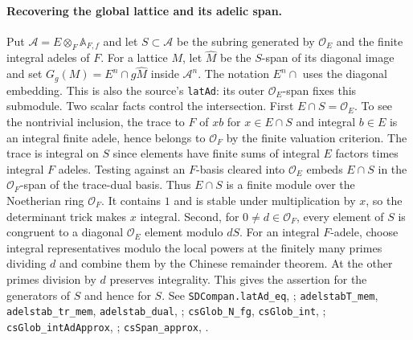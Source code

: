 \paragraph{Recovering the global lattice and its adelic span.}\label{r15:site-glob}
Put $\mathcal A=E\otimes_F\mathbb A_{F,f}$ and let $S\subset\mathcal A$
be the subring generated by $\mathcal O_E$ and the finite integral
adeles of $F$. For a lattice $M$, let $\widehat M$ be the $S$-span
of its diagonal image and set $G_g(M)=E^n\cap g\widehat M$ inside
$\mathcal A^n$. The notation $E^n\cap$ uses the diagonal embedding.
This is also the source's \nolinkurl{latAd}: its outer
$\mathcal O_E$-span fixes this submodule. Two scalar facts control the
intersection. First $E\cap S=\mathcal O_E$. To see the nontrivial
inclusion, the trace to $F$ of $xb$ for $x\in E\cap S$ and integral
$b\in E$ is an integral finite adele, hence belongs to $\mathcal O_F$
by the finite valuation criterion. The trace is integral on $S$ since
elements have finite sums of integral $E$ factors times integral $F$
adeles. Testing against an $F$-basis cleared into $\mathcal O_E$ embeds
$E\cap S$ in the $\mathcal O_F$-span of the trace-dual basis. Thus
$E\cap S$ is a finite module over the Noetherian ring $\mathcal O_F$.
It contains $1$ and is stable under multiplication by $x$, so the
determinant trick makes $x$ integral. Second, for
$0\ne d\in\mathcal O_F$, every element of $S$ is congruent to a
diagonal $\mathcal O_E$ element modulo $dS$. For an integral $F$-adele,
choose integral representatives modulo the local powers at the finitely
many primes dividing $d$ and combine them by the Chinese remainder
theorem. At the other primes division by $d$ preserves integrality.
This gives the assertion for the generators of $S$ and hence for $S$.
See \nolinkurl{SDCompan.latAd_eq}, ;
\nolinkurl{adelstabT_mem}, \nolinkurl{adelstab_tr_mem}, \nolinkurl{adelstab_dual},
;
\nolinkurl{csGlob_N_fg}, \nolinkurl{csGlob_int}, ;
\nolinkurl{csGlob_intAdApprox}, ;
\nolinkurl{csSpan_approx}, .

